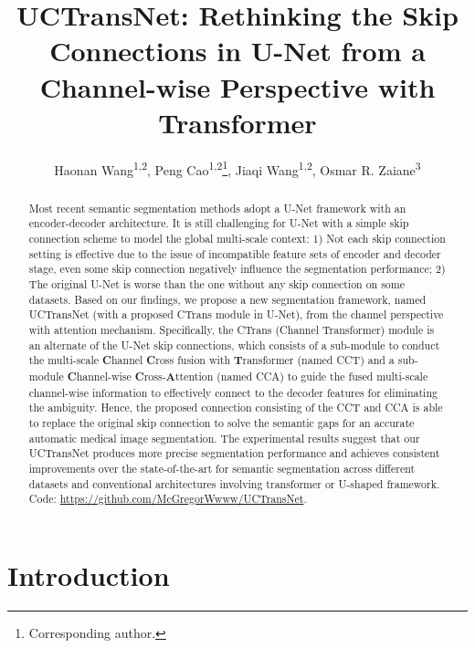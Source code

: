 \documentclass[letterpaper]{article} \usepackage{aaai22}  \usepackage{times}  \usepackage{helvet}  \usepackage{courier}  \usepackage[hyphens]{url}  \usepackage{graphicx} \urlstyle{rm} \def\UrlFont{\rm}  \usepackage{natbib}  \usepackage{caption} \DeclareCaptionStyle{ruled}{labelfont=normalfont,labelsep=colon,strut=off} \frenchspacing  \setlength{\pdfpagewidth}{8.5in}  \setlength{\pdfpageheight}{11in}  \usepackage{algorithm}
\title{UCTransNet: Rethinking the Skip Connections in U-Net from a Channel-wise Perspective with Transformer}
\author {
Haonan Wang\textsuperscript{\rm 1,\rm 2},
	Peng Cao\textsuperscript{\rm 1,\rm 2}\footnote{Corresponding author.},
	Jiaqi Wang\textsuperscript{\rm 1,\rm 2},
	Osmar R. Zaiane\textsuperscript{\rm 3}
}
\begin{document}
	
	\maketitle
	\begin{abstract}
		Most recent semantic segmentation methods adopt a U-Net framework with an encoder-decoder architecture. It is still challenging for U-Net with a simple skip connection scheme to model the global multi-scale context: 1) Not each skip connection setting is effective due to the issue of incompatible feature sets of encoder and decoder stage, even some skip connection negatively influence the segmentation performance; 2) The original U-Net is worse than the one without any skip connection on some datasets.
		Based on our findings, we propose a new segmentation framework, named UCTransNet (with a proposed CTrans module in U-Net), from the channel perspective with  attention mechanism. 
		Specifically, the CTrans (Channel Transformer) module is an alternate of the U-Net skip connections, which consists of a sub-module to conduct the multi-scale \textbf{C}hannel  \textbf{C}ross fusion with \textbf{T}ransformer  (named CCT) and a sub-module \textbf{C}hannel-wise \textbf{C}ross-\textbf{A}ttention (named CCA) to guide the fused multi-scale channel-wise information to effectively connect to the  decoder features for eliminating the ambiguity.  
		Hence, the proposed connection consisting of the CCT and CCA  is able to replace the original skip connection to solve the semantic gaps for an accurate automatic medical image segmentation.
		The experimental results suggest that our UCTransNet produces more precise segmentation performance and achieves consistent improvements over the state-of-the-art for semantic segmentation across different datasets and conventional architectures involving transformer or U-shaped framework.
		Code: \url{https://github.com/McGregorWwww/UCTransNet}.
		
		
	\end{abstract}
	
	
	\section{Introduction}
	
\end{document}

